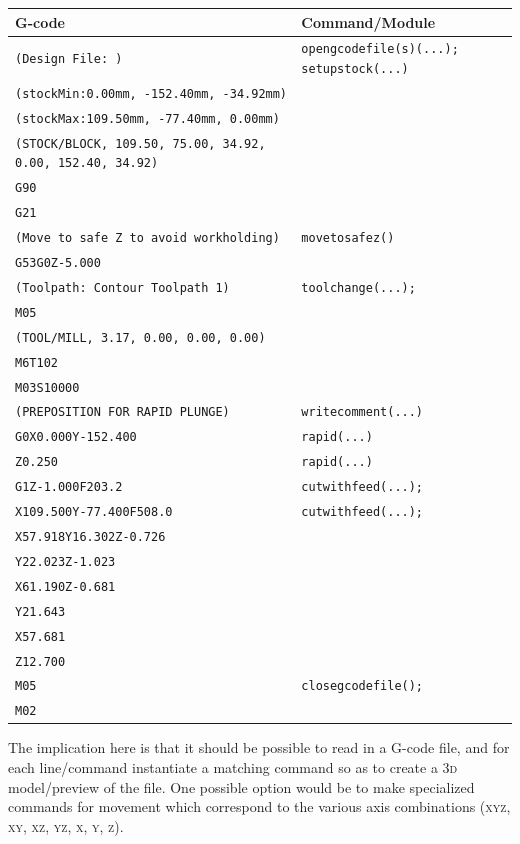 \documentclass{ltxdoc}
\begin{document}
\noindent \begin{tabular}{@{}ll@{}} \toprule
 G-code                                                           & Command/Module \\ \midrule
 \verb|(Design File: )| &  \texttt{opengcodefile(s)(...);}
                           \texttt{setupstock(...)}\\
 \verb|(stockMin:0.00mm, -152.40mm, -34.92mm)| \\
 \verb|(stockMax:109.50mm, -77.40mm, 0.00mm)| \\
 \verb|(STOCK/BLOCK, 109.50, 75.00, 34.92, 0.00, 152.40, 34.92)| \\
 \verb|G90| \\
 \verb|G21| \\ \midrule
 \verb|(Move to safe Z to avoid workholding)| &  \texttt{movetosafez()} \\
 \verb|G53G0Z-5.000| \\ \midrule
 \verb|(Toolpath: Contour Toolpath 1)| &  \texttt{toolchange(...);}\\
 \verb|M05| \\
 \verb|(TOOL/MILL, 3.17, 0.00, 0.00, 0.00)| \\
 \verb|M6T102| \\
 \verb|M03S10000|  \\ \midrule
 \verb|(PREPOSITION FOR RAPID PLUNGE)| & \texttt{writecomment(...)}\\ \midrule
 \verb|G0X0.000Y-152.400| & \texttt{rapid(...)}\\
 \verb|Z0.250| & \texttt{rapid(...)}\\ \midrule
 \verb|G1Z-1.000F203.2| & \texttt{cutwithfeed(...);}\\  
 \verb|X109.500Y-77.400F508.0| & \texttt{cutwithfeed(...);} \\ 
 \verb|X57.918Y16.302Z-0.726|\\ 
 \verb|Y22.023Z-1.023|\\ 
 \verb|X61.190Z-0.681|\\ 
 \verb|Y21.643|\\ 
 \verb|X57.681|\\
 \verb|Z12.700|\\ \midrule
 \verb|M05| &  \texttt{closegcodefile();}\\
 \verb|M02|\\
 \bottomrule
 \end{tabular}
\bigskip

The implication here is that it should be possible to read in a G-code file, and for each line/\allowbreak command instantiate a matching command so as to create a \textsc{3d} model/preview  of the file. One possible option would be to make specialized commands for movement which correspond to the various axis combinations (\textsc{xyz}, \textsc{xy}, \textsc{xz}, \textsc{yz}, \textsc{x}, \textsc{y}, \textsc{z}).
\end{document}

